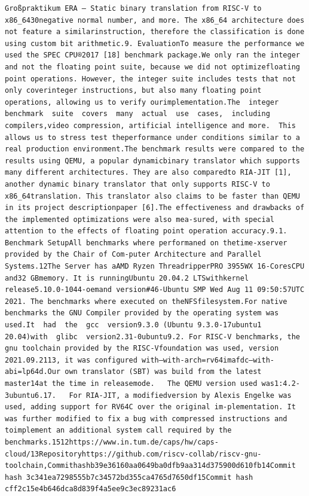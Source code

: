 \begin{frame}[fragile]
\begin{columns}[c]
\begin{lstlisting}[language=rv64, escapechar=!]
Großpraktikum ERA – Static binary translation from RISC-V to x86_6430negative normal number, and more. The x86_64 architecture does not feature a similarinstruction, therefore the classification is done using custom bit arithmetic.9. EvaluationTo measure the performance we used the SPEC CPU®2017 [18] benchmark package.We only ran the integer and not the floating point suite, because we did not optimizefloating point operations. However, the integer suite includes tests that not only coverinteger instructions, but also many floating point operations, allowing us to verify ourimplementation.The  integer  benchmark  suite  covers  many  actual  use  cases,  including  compilers,video compression, artificial intelligence and more.  This allows us to stress test theperformance under conditions similar to a real production environment.The benchmark results were compared to the results using QEMU, a popular dynamicbinary translator which supports many different architectures. They are also comparedto RIA-JIT [1], another dynamic binary translator that only supports RISC-V to x86_64translation. This translator also claims to be faster than QEMU in its project descriptionpaper [6].The effectiveness and drawbacks of the implemented optimizations were also mea-sured, with special attention to the effects of floating point operation accuracy.9.1. Benchmark SetupAll benchmarks where performaned on thetime-xserver provided by the Chair of Com-puter Architecture and Parallel Systems.12The Server has aAMD Ryzen ThreadripperPRO 3955WX 16-CoresCPU and32 GBmemory. It is runningUbuntu 20.04.2 LTSwithkernel release5.10.0-1044-oemand version#46-Ubuntu SMP Wed Aug 11 09:50:57UTC 2021. The benchmarks where executed on theNFSfilesystem.For native benchmarks the GNU Compiler provided by the operating system was used.It  had  the  gcc  version9.3.0 (Ubuntu 9.3.0-17ubuntu1 20.04)with  glibc  version2.31-0ubuntu9.2. For RISC-V benchmarks, the gnu toolchain provided by the RISC-Vfoundation was used, version 2021.09.2113, it was configured with–with-arch=rv64imafdc–with-abi=lp64d.Our own translator (SBT) was build from the latest master14at the time in releasemode.   The QEMU version used was1:4.2-3ubuntu6.17.   For RIA-JIT, a modifiedversion by Alexis Engelke was used, adding support for RV64C over the original im-plementation. It was further modified to fix a bug with compressed instructions and toimplement an additional system call required by the benchmarks.1512https://www.in.tum.de/caps/hw/caps-cloud/13Repositoryhttps://github.com/riscv-collab/riscv-gnu-toolchain,Commithashb39e36160aa0649ba0dfb9aa314d375900d610fb14Commit hash 3c341ea7298555b7c34572bd355ca4765d7650df15Commit hash cff2c15e4b646dca8d839f4a5ee9c3ec89231ac6

\end{lstlisting}
\end{columns}
\end{frame}
